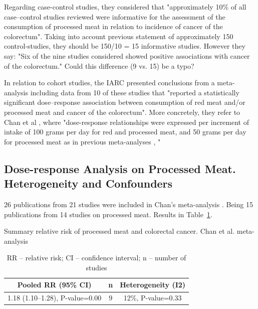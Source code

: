 \documentclass{article}
\begin{document}
Regarding case-control studies, they considered that "approximately 10\% of all case–control studies reviewed were informative for the assessment of the consumption of processed meat in relation to incidence of cancer of the colorectum". Taking into account previous statement of approximately 150 control-studies, they should be 150/10 = 15 informative studies. However they say: "Six of the nine studies considered showed positive associations with cancer of the colorectum." Could this difference (9 vs. 15) be a typo?

In relation to cohort studies, the IARC presented conclusions from a meta-analysis including data from 10
of these studies that "reported a statistically significant dose–response association between consumption
of red meat and/or processed meat and cancer of the colorectum". More concretely, they refer to Chan et al \cite{chan}, where "dose-response relationships were expressed per increment of intake of 100 grams
per day for red and processed meat, and 50 grams per day for processed meat as in previous meta-analyses \cite{aicr}, \cite{sandhu}"


\subsection{Dose-response Analysis on Processed Meat. Heterogeneity and Confounders}

26 publications from 21 studies were included in Chan's meta-analysis \cite{chan}. Being 15 publications from 14 studies on processed meat. Results in Table~\ref{tab:table}.

\begin{table}
 \caption{Summary relative risk of processed meat and colorectal cancer. Chan et al. meta-analysis}
  \centering

  \begin{center}
   \begin{tabular}{||c c c||}
   \hline
   Pooled RR (95\% CI)     & n     & Heterogeneity (I2)\\ [0.5ex]
   \hline\hline
     1.18 (1.10–1.28), P-value=0.00  & 9 & 12\%, P-value=0.33     \\ [1ex]
   \hline
  \end{tabular}

  \caption*{RR – relative risk; CI – confidence interval; n – number of studies}
  \end{center}

  \label{tab:table}
\end{table}
\end{document}
